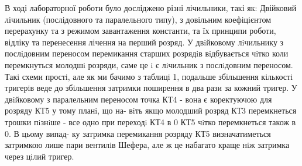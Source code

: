 \documentclass[a4paper,14pt]{extreport}
\begin{document}
\clearpage 
\newpage
\begin{center}
\textbf{}
\end{center}
 В ході лабораторної роботи було досліджено різні лічильники, такі як: Двійковий лічильник (послідовного та паралельного типу), з довільним коефіцієнтом перерахунку та з режимом завантаження константи, та їх принципи роботи, відліку та перенесення лічення на перший розряд.
У двiйковому лiчильнику з послiдовним переносом перемикання старших розрядiв вiдбувається чiтко коли перемкнуться молодшi
розряди, саме це i є лiчильник з послiдовним переносом. Такi схеми простi,
але як ми бачимо з таблицi 1, подальше збiльшення кiлькостi тригерiв веде
до збiльшення затримки поширення в два рази за кожний тригер. У двiйковому з паралельним переносом точка КТ4 - вона є коректуючою для розряду КТ5 у тому планi, що на-
вiть якщо молодший розряд КТ3 перемкнеться трошки пiзнiше - все одно
при переходi КТ4 в 0 КТ5 чiтко перемкнеться також в 0. В цьому випад-
ку затримка перемикання розряду КТ5 визначатиметься затримкою лише
пари вентилiв Шефера, але ж це набагато краще нiж затримка через цiлий
тригер.

\clearpage 
\newpage
\begin{center}
\textbf{}
\end{center}
 \begin{figure}[h!]
	 
\end{figure}
\end{document}
